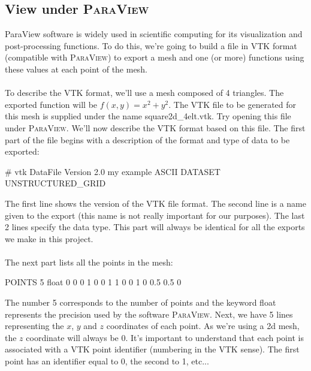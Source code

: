 \documentclass[11pt,a4paper]{article}
\begin{document}
\subsection{View under \textsc{ParaView}}
ParaView software is widely used in scientific computing for its visualization and post-processing functions.
To do this, we're going to build a file in VTK format (compatible with \textsc{ParaView}) to export a mesh and one (or more) functions using these values at each point of the mesh.

\paragraph{}
To describe the VTK format, we'll use a mesh composed of 4 triangles. The exported function will be $f(x,y)=x^2+y^2$.
The VTK file to be generated for this mesh is supplied under the name square2d\_4elt.vtk. Try opening this file under \textsc{ParaView}.
We'll now describe the VTK format based on this file.
The first part of the file begins with a description of the format and type of data to be exported:
\begin{mycpplistingInTabular}{}
# vtk DataFile Version 2.0
my example
ASCII
DATASET UNSTRUCTURED_GRID
\end{mycpplistingInTabular}
The first line shows the version of the VTK file format.
The second line is a name given to the export (this name is not really important for our purposes).
The last 2 lines specify the data type.
This part will always be identical for all the exports we make in this project.

\paragraph{}
The next part lists all the points in the mesh:
\begin{mycpplistingInTabular}{}
POINTS 5 float
0 0 0
1 0 0
1 1 0
0 1 0
0.5 0.5 0
\end{mycpplistingInTabular}
The number 5 corresponds to the number of points and the keyword float represents the precision used by the software \textsc{ParaView}.
Next, we have 5 lines representing the $x$, $y$ and $z$ coordinates of each point. As we're using a 2d mesh, the $z$ coordinate will always be 0.
It's important to understand that each point is associated with a VTK point identifier (numbering in the VTK sense). The first point has an identifier equal to 0, the second to 1, etc...
\end{document}
